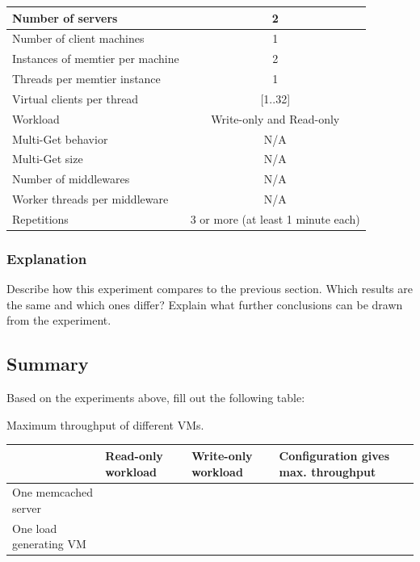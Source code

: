 \documentclass[11pt,a4paper]{article}
\begin{document}
\begin{center}
	\scriptsize{
		\begin{tabular}{|l|c|}
			\hline Number of servers                & 2                        \\ 
			\hline Number of client machines        & 1                        \\ 
			\hline Instances of memtier per machine & 2                        \\ 
			\hline Threads per memtier instance     & 1                        \\
			\hline Virtual clients per thread       & [1..32]                  \\ 
			\hline Workload                         & Write-only and Read-only \\
			\hline Multi-Get behavior               & N/A                      \\
			\hline Multi-Get size                   & N/A                      \\
			\hline Number of middlewares            & N/A                      \\
			\hline Worker threads per middleware    & N/A                      \\
			\hline Repetitions                      & 3 or more (at least 1 minute each)                \\ 
			\hline 
		\end{tabular}
	} 
\end{center}

\subsubsection{Explanation}

Describe how this experiment compares to the previous section. Which results are the same and which ones differ? Explain what further conclusions can be drawn from the experiment.


\subsection{Summary}

Based on the experiments above, fill out the following table:

\begin{center}
	{Maximum throughput of different VMs.}
	\begin{tabular}{|l|p{2cm}|p{2cm}|p{4cm}|}
		\hline                        & Read-only workload & Write-only workload & Configuration gives max. throughput \\ 
		\hline One memcached server   &                    &                     &                                     \\ 
		\hline One load generating VM &                    &                     &                                     \\ 
		\hline 
	\end{tabular}
\end{center}
\end{document}
